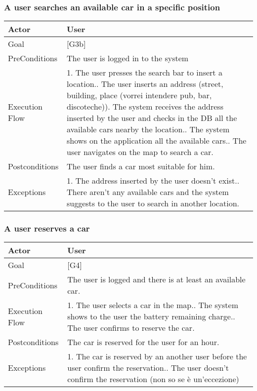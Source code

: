 \documentclass{article}
\begin{document}
	\subsubsection{A user searches an available car in a specific position}
	\begin{tabularx}{\textwidth}{  l  X  }
		\hline
		Actor & User\\
		\hline
		Goal & [G3b]\\
		\hline
		PreConditions & The user is logged in to the system\\
		\hline
		Execution Flow & 1. The user presses the search bar to insert a location.\newline
										 2. The user inserts an address (street, building, place (vorrei intendere pub, bar, discoteche))\newline
										 3. The system receives the address inserted by the user and checks in the DB all the available cars nearby the location.\newline
										 4. The system shows on the application all the available cars.\newline
										 5. The user navigates on the map to search a car.\\
		\hline
		Postconditions & The user finds a car most suitable for him.\\
		\hline
		Exceptions & 1. The address inserted by the user doesn't exist.\newline
								 2. There aren't any available cars and the system suggests to the user to search in another location.\\
		\hline
	\end{tabularx}

	\subsubsection{A user reserves a car}
	\begin{tabularx}{\textwidth}{  l  X  }
		\hline
		Actor & User\\
		\hline
		Goal & [G4]\\
		\hline
		PreConditions & The user is logged and there is at least an available car.\\
		\hline
		Execution Flow & 1. The user selects a car in the map.\newline
										 2. The system shows to the user the battery remaining charge.\newline
										 3. The user confirms to reserve the car.\\
		\hline
		Postconditions & The car is reserved for the user for an hour. \\
		\hline
		Exceptions & 1. The car is reserved by an another user before the user confirm the reservation.\newline
								 2. The user doesn't confirm the reservation (non so se è un'eccezione)\\
		\hline
	\end{tabularx}
\end{document}
